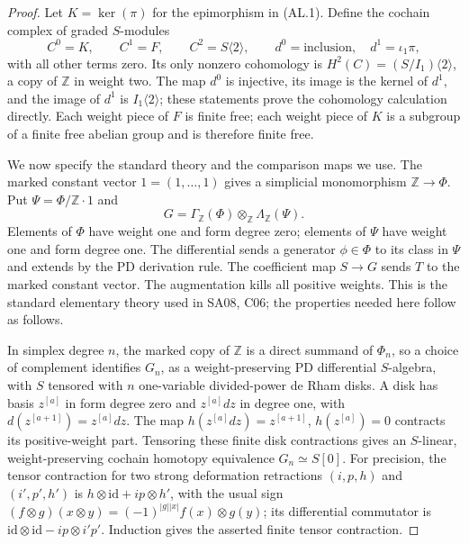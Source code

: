 \begin{proof}
Let $K=\ker(\pi)$ for the epimorphism in \textup{(AL.1)}.  Define
the cochain complex of graded $S$-modules
\[
 C^0=K,\qquad C^1=F,\qquad C^2=S\langle2\rangle,
 \qquad d^0=\text{inclusion},\quad d^1=\iota_1\pi ,
 \tag{AL.3}
\]
with all other terms zero.  Its only nonzero cohomology is
$H^2(C)=(S/I_1)\langle2\rangle$, a copy of $\mathbb Z$ in weight
two.  The map $d^0$ is injective, its image is the kernel of $d^1$,
and the image of $d^1$ is $I_1\langle2\rangle$; these statements
prove the cohomology calculation directly.  Each weight piece of
$F$ is finite free; each weight piece of $K$ is a subgroup of a
finite free abelian group and is therefore finite free.

We now specify the standard theory and the comparison maps we use.
The marked constant vector $1=(1,\ldots,1)$ gives a simplicial
monomorphism $\mathbb Z\to\Phi$.  Put
$\Psi=\Phi/\mathbb Z\cdot1$ and
\[
 G=\Gamma_{\mathbb Z}(\Phi)\otimes_{\mathbb Z}\Lambda_{\mathbb Z}(\Psi).
 \tag{AL.4}
\]
Elements of $\Phi$ have weight one and form degree zero; elements
of $\Psi$ have weight one and form degree one.  The differential
sends a generator $\phi\in\Phi$ to its class in $\Psi$ and extends
by the PD derivation rule.  The coefficient map $S\to G$ sends
$T$ to the marked constant vector.  The augmentation kills all
positive weights.  This is the standard elementary theory used
in SA08, C06; the properties needed here follow as follows.

In simplex degree $n$, the marked copy of $\mathbb Z$ is a direct
summand of $\Phi_n$, so a choice of complement identifies
$G_n$, as a weight-preserving PD differential $S$-algebra, with
$S$ tensored with $n$ one-variable divided-power de Rham disks.
A disk has basis $z^{[a]}$ in form degree zero and
$z^{[a]}dz$ in degree one, with
$d(z^{[a+1]})=z^{[a]}dz$.
The map $h(z^{[a]}dz)=z^{[a+1]}$, $h(z^{[a]})=0$ contracts its
positive-weight part.  Tensoring these finite disk contractions
gives an $S$-linear, weight-preserving cochain homotopy equivalence
$G_n\simeq S[0]$.  For precision, the tensor contraction for two
strong deformation retractions $(i,p,h)$ and $(i',p',h')$ is
$h\otimes\mathrm{id}+ip\otimes h'$, with the usual sign
$(f\otimes g)(x\otimes y)=(-1)^{|g||x|}f(x)\otimes g(y)$;
its differential commutator is
$\mathrm{id}\otimes\mathrm{id}-ip\otimes i'p'$.
Induction gives the asserted finite tensor contraction.


\end{proof}
